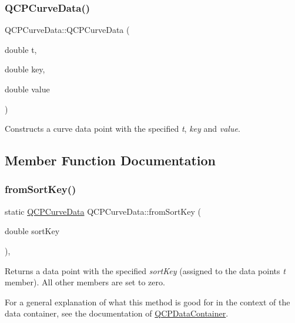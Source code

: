 \subsubsection{\texorpdfstring{Q\+C\+P\+Curve\+Data()}{QCPCurveData()}\hspace{0.1cm}{\footnotesize\ttfamily [2/2]}}
{\footnotesize\ttfamily Q\+C\+P\+Curve\+Data\+::\+Q\+C\+P\+Curve\+Data (\begin{DoxyParamCaption}\item[{double}]{t,  }\item[{double}]{key,  }\item[{double}]{value }\end{DoxyParamCaption})}

Constructs a curve data point with the specified {\itshape t}, {\itshape key} and {\itshape value}. 

\subsection{Member Function Documentation}
\mbox{\label{class_q_c_p_curve_data_a40adf1a6ba93051c415a65298b49aa6e}} 
\subsubsection{\texorpdfstring{from\+Sort\+Key()}{fromSortKey()}}
{\footnotesize\ttfamily static \hyperlink{class_q_c_p_curve_data}{Q\+C\+P\+Curve\+Data} Q\+C\+P\+Curve\+Data\+::from\+Sort\+Key (\begin{DoxyParamCaption}\item[{double}]{sort\+Key }\end{DoxyParamCaption})\hspace{0.3cm}{\ttfamily [inline]}, {\ttfamily [static]}}

Returns a data point with the specified {\itshape sort\+Key} (assigned to the data point\textquotesingle{}s {\itshape t} member). All other members are set to zero.

For a general explanation of what this method is good for in the context of the data container, see the documentation of \hyperlink{class_q_c_p_data_container}{Q\+C\+P\+Data\+Container}. \mbox{\label{class_q_c_p_curve_data_ac805ffc8b4207652efb9fcc6a2cdd3e8}} 
